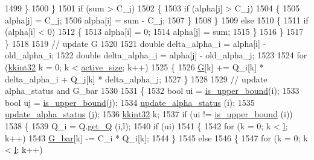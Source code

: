 \begin{DoxyCode}
1499         \}
1500       \}
1501       \textcolor{keywordflow}{if}  (sum > C\_j)
1502       \{
1503         \textcolor{keywordflow}{if}  (alpha[j] > C\_j)
1504         \{
1505           alpha[j] = C\_j;
1506           alpha[i] = sum - C\_j;
1507         \}
1508       \}
1509       \textcolor{keywordflow}{else}
1510       \{
1511         \textcolor{keywordflow}{if}  (alpha[i] < 0)
1512         \{
1513           alpha[i] = 0;
1514           alpha[j] = sum;
1515         \}
1516       \}
1517     \}
1518 
1519     \textcolor{comment}{// update G}
1520 
1521     \textcolor{keywordtype}{double} delta\_alpha\_i = alpha[i] - old\_alpha\_i;
1522     \textcolor{keywordtype}{double} delta\_alpha\_j = alpha[j] - old\_alpha\_j;
1523     
1524     \textcolor{keywordflow}{for}  (\hyperlink{namespace_k_k_b_a8fa4952cc84fda1de4bec1fbdd8d5b1b}{kkint32} k = 0;  k < \hyperlink{class_s_v_m289___b_f_s_1_1_solver_a602b406f795ec9054a09d9a1ef23a8c6}{active\_size};  k++)
1525     \{
1526       \hyperlink{class_s_v_m289___b_f_s_1_1_solver_a23dd808efd06b7ef3a97c54b0c3c8824}{G}[k] += Q\_i[k] * delta\_alpha\_i + Q\_j[k] * delta\_alpha\_j;
1527     \}
1528 
1529     \textcolor{comment}{// update alpha\_status and G\_bar}
1530 
1531     \{
1532       \textcolor{keywordtype}{bool} ui = \hyperlink{class_s_v_m289___b_f_s_1_1_solver_a1bdbc9dfa56364a34b927beac631d125}{is\_upper\_bound}(i);
1533       \textcolor{keywordtype}{bool} uj = \hyperlink{class_s_v_m289___b_f_s_1_1_solver_a1bdbc9dfa56364a34b927beac631d125}{is\_upper\_bound}(j);
1534       \hyperlink{class_s_v_m289___b_f_s_1_1_solver_ab0cc95a78b498383fc52e0ea8df34a3c}{update\_alpha\_status} (i);
1535       \hyperlink{class_s_v_m289___b_f_s_1_1_solver_ab0cc95a78b498383fc52e0ea8df34a3c}{update\_alpha\_status} (j);
1536       \hyperlink{namespace_k_k_b_a8fa4952cc84fda1de4bec1fbdd8d5b1b}{kkint32} k;
1537       \textcolor{keywordflow}{if}  (ui != \hyperlink{class_s_v_m289___b_f_s_1_1_solver_a1bdbc9dfa56364a34b927beac631d125}{is\_upper\_bound} (i))
1538       \{
1539         Q\_i = Q.\hyperlink{class_s_v_m289___b_f_s_1_1_q_matrix_a5c3621d65b8135452db286640f53cbe0}{get\_Q} (i,l);
1540         \textcolor{keywordflow}{if}  (ui)
1541         \{
1542           \textcolor{keywordflow}{for}  (k = 0;  k < \hyperlink{class_s_v_m289___b_f_s_1_1_solver_af63e60689ab3dd865e76e2c1d35db148}{l};  k++)
1543             \hyperlink{class_s_v_m289___b_f_s_1_1_solver_a81ba66cfcf5abb112056da0e56fce551}{G\_bar}[k] -= C\_i * Q\_i[k];
1544         \}
1545         \textcolor{keywordflow}{else}
1546         \{
1547           \textcolor{keywordflow}{for}  (k = 0;  k < \hyperlink{class_s_v_m289___b_f_s_1_1_solver_af63e60689ab3dd865e76e2c1d35db148}{l};  k++)

\end{DoxyCode}
